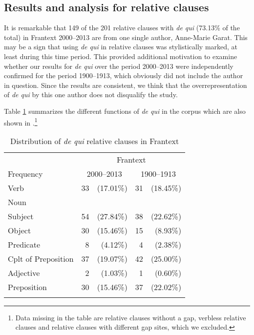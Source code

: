 \subsection{Results and analysis for relative clauses}

It is remarkable that 149 of the 201 relative clauses with \emph{de qui} (73.13\% of the total) in Frantext 2000--2013 are from one single author, Anne-Marie Garat. This may be a sign that using \emph{de qui} in relative clauses was stylistically marked, at least during this time period. This provided additional motivation to examine whether our results for \emph{de qui} over the period 2000--2013 were independently confirmed for the period 1900--1913, which obviously did not include the author in question. Since the results are consistent, we think that the overrepresentation of \textit{de qui} by this one author does not disqualify the study. 

Table \ref{tab:dq2000} summarizes the different functions of \emph{de qui} in the corpus which are also shown in .\footnote{Data missing in the table are relative clauses without a gap, verbless relative clauses and relative clauses with different gap sites, which we excluded.}

\begin{table}
    \begin{tabular}{l *2{r@{~}r}}
         \lsptoprule
                   & \multicolumn{4}{c}{Frantext}\\\cmidrule(lr){2-5}
         Frequency &  \multicolumn{2}{c}{2000--2013} &  \multicolumn{2}{c}{1900–1913} \\\midrule
         Verb & 33 & (17.01\%) & 31 & (18.45\%) \\
         Noun & & \\
         \quad Subject             & 54 & (27.84\%) & 38 & (22.62\%) \\
         \quad Object              & 30 & (15.46\%) & 15 & (8.93\%) \\
         \quad Predicate           & 8  & (4.12\%)  & 4  & (2.38\%) \\
         \quad Cplt of Preposition & 37 & (19.07\%) & 42 & (25.00\%) \\
         Adjective                 & 2  & (1.03\%)  & 1  & (0.60\%) \\
         Preposition               & 30 & (15.46\%) & 37 & (22.02\%) \\
         \lspbottomrule
    \end{tabular}
    \caption{Distribution of \emph{de qui} relative clauses in Frantext}
    \label{tab:dq2000}
\end{table}

